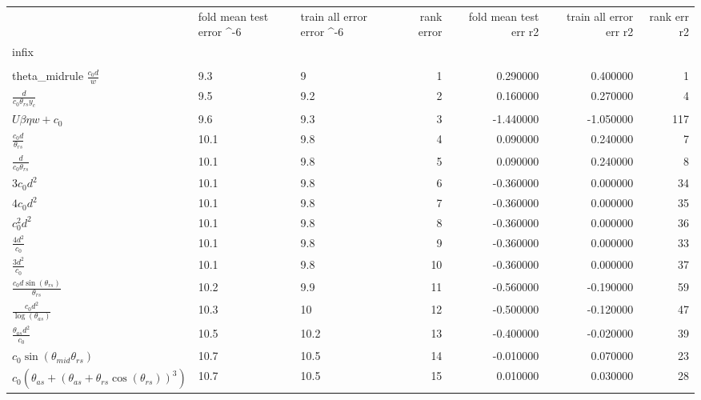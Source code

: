 \begin{tabularx}{\textwidth}{lllrrrr}
\toprule
  &  fold mean test error \cdot 10^-6  &  train all error error \cdot 10^-6  &  rank error  &  fold mean test err r2  &  train all error err r2  &  rank err r2  \\ 
infix  &    &    &    &    &    &    \\ 
\\theta_{mid}rule
$ \displaystyle\frac{c_{0} d}{w} $  &  9.3  &  9\phantom{.0}  &  1  &  0.290000  &  0.400000  &  1  \\ 
$ \displaystyle\frac{d}{c_{0} \theta_{rs} y_c} $  &  9.5  &  9.2  &  2  &  0.160000  &  0.270000  &  4  \\ 
$ U \beta \eta w + c_{0} $  &  9.6  &  9.3  &  3  &  -1.440000  &  -1.050000  &  117  \\ 
$ \displaystyle\frac{c_{0} d}{\theta_{rs}} $  &  10.1  &  9.8  &  4  &  0.090000  &  0.240000  &  7  \\ 
$ \displaystyle\frac{d}{c_{0} \theta_{rs}} $  &  10.1  &  9.8  &  5  &  0.090000  &  0.240000  &  8  \\ 
$ 3 c_{0} d^{2} $  &  10.1  &  9.8  &  6  &  -0.360000  &  0.000000  &  34  \\ 
$ 4 c_{0} d^{2} $  &  10.1  &  9.8  &  7  &  -0.360000  &  0.000000  &  35  \\ 
$ c_{0}^{2} d^{2} $  &  10.1  &  9.8  &  8  &  -0.360000  &  0.000000  &  36  \\ 
$ \displaystyle\frac{4 d^{2}}{c_{0}} $  &  10.1  &  9.8  &  9  &  -0.360000  &  0.000000  &  33  \\ 
$ \displaystyle\frac{3 d^{2}}{c_{0}} $  &  10.1  &  9.8  &  10  &  -0.360000  &  0.000000  &  37  \\ 
$ \displaystyle\frac{c_{0} d \sin{\left(\theta_{rs} \right)}}{\theta_{rs}} $  &  10.2  &  9.9  &  11  &  -0.560000  &  -0.190000  &  59  \\ 
$ \displaystyle\frac{c_{0} d^{2}}{\log{\left(\theta_{as} \right)}} $  &  10.3  &  10\phantom{.0}  &  12  &  -0.500000  &  -0.120000  &  47  \\ 
$ \displaystyle\frac{\theta_{as} d^{2}}{c_{0}} $  &  10.5  &  10.2  &  13  &  -0.400000  &  -0.020000  &  39  \\ 
$ c_{0} \sin{\left(\theta_{mid} \theta_{rs} \right)} $  &  10.7  &  10.5  &  14  &  -0.010000  &  0.070000  &  23  \\ 
$ c_{0} \left(\theta_{as} + \left(\theta_{as} + \theta_{rs} \cos{\left(\theta_{rs} \right)}\right)^{3}\right) $  &  10.7  &  10.5  &  15  &  0.010000  &  0.030000  &  28  \\ 

\end{tabularx}
